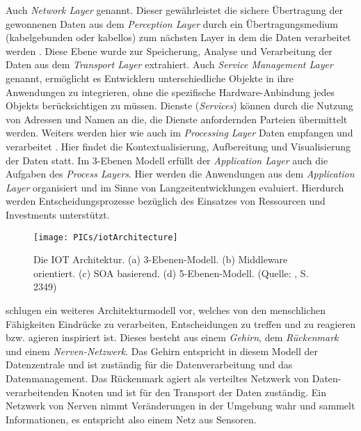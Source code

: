 \documentclass[BMR,Bachelor,ngerman]{twbook}%
\begin{document}
 Auch \emph{Network Layer} genannt. Dieser gewährleistet die sichere Übertragung der gewonnenen Daten aus dem \emph{Perception Layer} durch ein Übertragungsmedium (kabelgebunden oder kabellos) zum nächsten Layer in dem die Daten verarbeitet werden \cite{khan2012future}.
%
 Diese Ebene wurde zur Speicherung, Analyse und Verarbeitung der Daten aus dem \emph{Transport Layer} extrahiert.
%
 Auch \emph{Service Management Layer} genannt, ermöglicht es Entwicklern  unterschiedliche Objekte in ihre Anwendungen zu integrieren, ohne die spezifische Hardware-Anbindung jedes Objekts berücksichtigen zu müssen. Dienste (\emph{Services}) können durch die Nutzung von Adressen und Namen an die, die Dienste anfordernden Parteien übermittelt werden. Weiters werden hier wie auch im \emph{Processing Layer} Daten empfangen und verarbeitet \cite{alfuqaha2015survey}.
%
 Hier findet die Kontextualisierung, Aufbereitung und Visualisierung der Daten statt. Im 3-Ebenen Modell erfüllt der \emph{Application Layer} auch die Aufgaben des \emph{Process Layers}.
%
 Hier werden die Anwendungen aus dem \emph{Application Layer} organisiert und im Sinne von Langzeitentwicklungen evaluiert. Hierdurch werden Entscheidungsprozesse bezüglich des Einsatzes von Ressourcen und Investments unterstützt.
\begin{figure}[!htbp]
\centering
\texttt{[image: PICs/iotArchitecture]}
\caption{Die \ac{IOT} Architektur. (a) 3-Ebenen-Modell. (b) Middleware orientiert. (c) SOA basierend. (d) 5-Ebenen-Modell. (Quelle: \protect\cite{alfuqaha2015survey}, S. 2349)}\label{fig:layer}
\end{figure}
%
 schlugen ein weiteres Architekturmodell vor, welches von den menschlichen Fähigkeiten Eindrücke zu verarbeiten, Entscheidungen zu treffen und zu reagieren bzw. agieren inspiriert ist. Dieses besteht aus einem \emph{Gehirn}, dem \emph{Rückenmark} und einem \emph{Nerven-Netzwerk}. Das Gehirn entspricht in diesem Modell der Datenzentrale und ist zuständig für die Datenverarbeitung und das Datenmanagement. Das Rückenmark agiert als verteiltes Netzwerk von Daten-verarbeitenden Knoten und ist für den Transport der Daten zuständig. Ein Netzwerk von Nerven nimmt Veränderungen in der Umgebung wahr und sammelt Informationen, es entspricht also einem Netz aus Sensoren.
\end{document}
